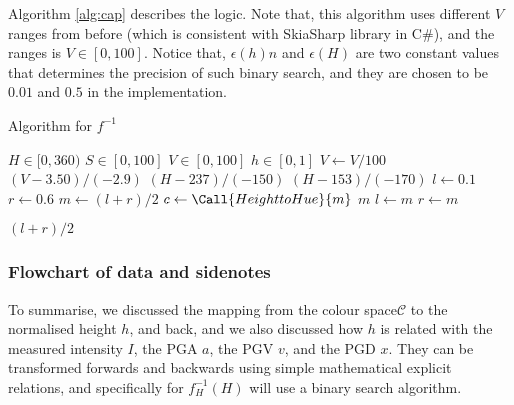 Algorithm \ref{alg:cap} describes the logic. Note that, this algorithm uses different \(V\) ranges from before (which is consistent with SkiaSharp library in C\#), and the ranges is \(V \in [0, 100]\). Notice that, \(\epsilon(h)n\) and \(\epsilon(H)\) are two constant values that determines the precision of such binary search, and they are chosen to be \(0.01\) and \(0.5\) in the implementation.

\begin{algorithm}[htp]
    \caption{Algorithm for \(f^{-1}\)}\label{alg:cap}
    \begin{algorithmic}
        \Require \(H \in [0, 360)\)
        \Require \(S \in [0, 100]\)
        \Require \(V \in [0, 100]\)
        \Ensure \(h \in [0, 1]\)
        \State \(V \gets V / 100\) 
         
        \State \Return \((V - 3.50) / (-2.9)\)
        \Else {}
        \State \Return \((H - 237) / (-150)\)
        \State \Return \((H - 153) / (-170)\)
        \Else
        \State \(l \gets 0.1\)
        \State \(r \gets 0.6\)
        \State \(m \gets (l + r) / 2\)
        \State \(c \gets \Call{Height to Hue}{m}\)
        \State \Return \(m\)
        \State \(l \gets m\)
        \State \(r \gets m\)
        \EndIf
        \EndWhile

        \State \Return \((l + r) / 2\)
        \EndIf
        \EndIf
    \end{algorithmic}
\end{algorithm}

\subsubsection{Flowchart of data and sidenotes}

To summarise, we discussed the mapping from the colour space\(\mathcal{C}\) to the normalised height \(h\), and back, and we also discussed how \(h\) is related with the measured intensity \(I\), the PGA \(a\), the PGV \(v\), and the PGD \(x\). They can be transformed forwards and backwards using simple mathematical explicit relations, and specifically for \(f_H^{-1}(H)\) will use a binary search algorithm.

